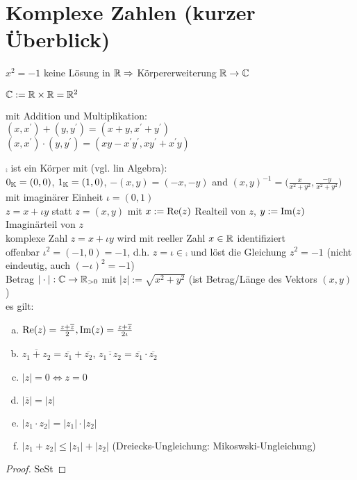 \chapter{Komplexe Zahlen (kurzer Überblick)}
\begin{description}
	\item[Problem:] $x^2 = -1$ keine Lösung in $\mathbb{R} \Rightarrow$ Körpererweiterung $\mathbb{R} \to \mathbb{C}$
	\item[Betrachte Menge der komplexen Zahlen] $\mathbb{C} := \mathbb{R} \times \mathbb{R} = \mathbb{R}^2$
	\item mit Addition und Multiplikation:\\
	$(x,x^{'}) + (y,y^{'}) = (x+y, x^{'} + y^{'})$\\
	$(x,x^{'}) \cdot (y,y^{'}) = (xy - x^{'}y^{'}, xy^{'}+x^{'}y)$
	\item $\comp$ ist ein Körper mit (vgl. lin Algebra):\\
	$0_{\mathbb{K}} = (0,0)$,  $1_{\mathbb{K}} = (1,0)$, $-(x,y) = (-x,-y)$ and $(x,y)^{-1} = \bigg(\frac{x}{x^2+y^2},\frac{-y}{x^2+y^2}\bigg)$\\
	mit imaginärer Einheit $\iota=(0,1)$\\
	$z=x+\iota y$ statt $z=(x,y)$ mit $x:=\operatorname{Re}(z)$ Realteil von $z$, $y:= \operatorname{Im}(z)$ Imaginärteil von $z$\\
	komplexe Zahl $z=x + \iota y$ wird mit reeller Zahl $x \in \mathbb{R}$ identifiziert\\
	offenbar $\iota^2=(-1,0)=-1$, d.h. $z=\iota \in \comp$ und löst die Gleichung $z^2=-1$ (nicht eindeutig, auch $(-\iota)^2 = -1$)\\
	Betrag $|\cdot|: \mathbb{C} \to \mathbb{R}_{> 0}$ mit $|z|:= \sqrt{x^2+y^2}$ (ist Betrag/Länge des Vektors $(x,y)$)\\
	es gilt:
	\begin{enumerate}[a)]
		\item $\operatorname{Re}(z) = \frac{z+\overline{z}}{2}, \operatorname{Im}(z) = \frac{z+\overline{z}}{2\iota}$
		\item $\overline{z_1 + z_2} = \overline{z_1} + \overline{z_2}$, $\overline{z_1 \cdot z_2} = \overline{z_1} \cdot \overline{z_2}$
		\item $|z| = 0 \iff z=0$
		\item $|\overline{z}| = |z|$
		\item $|z_1 \cdot z_2| = |z_1| \cdot |z_2|$
		\item $|z_1 + z_2| \leq |z_1| + |z_2|$ (Dreiecks-Ungleichung: Mikoswski-Ungleichung)
	\end{enumerate}
\begin{proof}
	SeSt \QEDA
\end{proof}
\end{description}